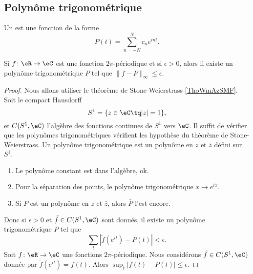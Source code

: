 \subsection{Polynôme trigonométrique}

Un  est une fonction de la forme
\begin{equation}
    P(t)=\sum_{n=-N}^Nc_n e^{int}.
\end{equation}

\begin{lemma}   \label{LemXGYaRlC}
    Si \( f\colon \eR\to \eC\) est une fonction \( 2\pi\)-périodique et si \( \epsilon>0\), alors il existe un polynôme trigonométrique \( P\) tel que \( \| f-P \|_{\infty}\leq \epsilon\).
\end{lemma}

\begin{proof}
    Nous allons utiliser le théorème de Stone-Weierstrass \ref{ThoWmAzSMF}. Soit le compact Hausdorff
    \begin{equation}
        S^1=\{ z\in \eC\tq | z |=1 \},
    \end{equation}
    et \( C(S^1,\eC)\) l'algèbre des fonctions continues de \( S^1\) vers \( \eC\). Il suffit de vérifier que les polynômes trigonométriques vérifient les hypothèse du théorème de Stone-Weierstrass. Un polynôme trigonométrique est un polynôme en \( z\) et \( \bar z\) défini sur \( S^1\).
    \begin{enumerate}
        \item
            Le polynôme constant est dans l'algèbre, ok.
        \item
            Pour la séparation des points, le polynôme trigonométrique \( x\mapsto  e^{ix}\).
        \item
            Si \( P\) est un polynôme en \( z\) et \( \bar z\), alors \( \bar P\) l'est encore.
    \end{enumerate}
    Donc si \( \epsilon>0\) et \( \tilde f\in C(S^1,\eC)\) sont donnés, il existe un polynôme trigonométrique \( P\) tel que
    \begin{equation}
        \sum_t| \tilde f( e^{it})-P(t) |<\epsilon.
    \end{equation}
    Soit \( f\colon \eR\to \eC\) une fonctions \( 2\pi\)-périodique. Nous considérons \( \tilde f\in C(S^1,\eC)\) donnée par \( \tilde f( e^{it})=f(t)\). Alors \( \sup_t| f(t)-P(t) |\leq \epsilon\).
\end{proof}

